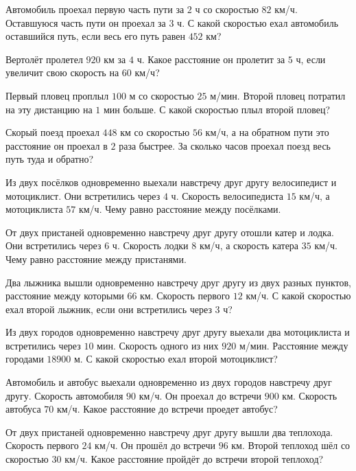 \begin{class}[number=3]
	\begin{listofex}
		\item  Автомобиль проехал первую часть пути за \( 2 \) ч со скоростью \( 82 \) км/ч. Оставшуюся часть пути он проехал за \( 3 \) ч. С какой скоростью ехал автомобиль оставшийся путь, если весь его путь равен \( 452 \) км?
		\item  Вертолёт пролетел \( 920 \) км за \( 4 \) ч. Какое расстояние он пролетит за \( 5 \) ч, если увеличит свою скорость на \( 60 \) км/ч?
		\item Первый пловец проплыл \( 100 \) м со скоростью \( 25 \) м/мин. Второй пловец потратил на эту дистанцию на \( 1 \) мин больше. С какой скоростью плыл второй пловец?
		\item Скорый поезд проехал \( 448 \) км со скоростью \( 56 \) км/ч, а на обратном пути это расстояние он проехал в \( 2 \) раза быстрее. За сколько часов проехал поезд весь путь туда и обратно?
		\item Из двух посёлков одновременно выехали навстречу друг другу велосипедист и мотоциклист. Они встретились через \( 4 \) ч. Скорость велосипедиста \( 15 \) км/ч, а мотоциклиста \( 57 \) км/ч. Чему равно расстояние между посёлками.
		\item От двух пристаней одновременно навстречу друг другу отошли катер и лодка. Они встретились через \( 6 \) ч. Скорость лодки \( 8 \) км/ч, а скорость катера \( 35 \) км/ч. Чему равно расстояние между пристанями.
		\item Два лыжника вышли одновременно навстречу друг другу из двух разных пунктов, расстояние между которыми \( 66 \) км. Скорость первого \( 12 \) км/ч. С какой скоростью ехал второй лыжник, если они встретились через \( 3 \) ч?
		\item Из двух городов одновременно навстречу друг другу выехали два мотоциклиста и встретились через \( 10 \) мин. Скорость одного из них \( 920 \) м/мин. Расстояние между городами \( 18 900 \) м. С какой скоростью ехал второй мотоциклист?
		\item Автомобиль и автобус выехали одновременно из двух городов навстречу друг другу. Скорость автомобиля \( 90 \) км/ч. Он проехал до встречи \( 900 \) км. Скорость автобуса \( 70 \) км/ч. Какое расстояние до встречи проедет автобус?
		\item От двух пристаней одновременно навстречу друг другу вышли два теплохода. Скорость первого \( 24 \) км/ч. Он прошёл до встречи \( 96 \) км. Второй теплоход шёл со скоростью \( 30 \) км/ч. Какое расстояние пройдёт до встречи второй теплоход?
	\end{listofex}
\end{class}

